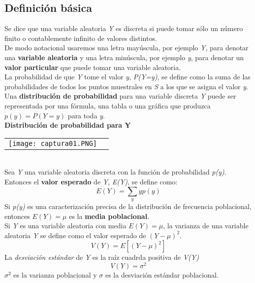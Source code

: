 \documentclass[10pt]{article}\usepackage[]{graphicx}\usepackage[]{color}
\begin{document}
\subsection{Definición básica}
Se dice que una variable aleatoria \textit{Y} es discreta si puede tomar sólo un número finito o contablemente infinito de valores distintos.\\
De modo notacional usaremos una letra mayúscula, por ejemplo \textit{Y}, para denotar una \textbf{variable aleatoria} y una letra minúscula, por ejemplo \textit{y}, para denotar un \textbf{valor particular} que puede tomar una variable aleatoria.\\
La probabilidad de que \textit{Y} tome el valor \textit{y}, \textit{P(Y=y)}, se define como la suma de las probabilidades de todos los puntos muestrales en \textit{S} a los que se asigna el valor \textit{y}.\\
Una \textbf{distribución de probabilidad} para una variable discreta \textit{Y} puede ser representada por una fórmula, una tabla o una gráfica que produzca $p(y)=P(Y=y)$ para toda \textit{y}.\\
\textbf{Distribución de probabilidad para Y}\\
\begin{tabular}{p{} p{} }
\texttt{[image: captura01.PNG]}
\end{tabular}\\
Sea \textit{Y} una variable aleatoria discreta con la función de probabilidad \textit{p(y)}. Entonces el \textbf{valor esperado} de \textit{Y}, \textit{E(Y)}, se define como:
\begin{equation*}
E(Y)=\sum_y yp(y)
\end{equation*}
Si \textit{p(y)} es una caracterización precisa de la distribución de frecuencia poblacional, entonces $E(Y)=\mu$ es la \textbf{media poblacional}.\\
Si \textit{Y} es una variable aleatoria con media $E(Y)=\mu$, la varianza de una variable aleatoria \textit{Y} se define como el valor esperado de $(Y-\mu)^2$.
\begin{equation*}
V(Y)=E[(Y-\mu)^2]
\end{equation*}
La \textit{desviación estándar} de \textit{Y} es la raíz cuadrda positiva de \textit{V(Y)}
\begin{equation*}
V(Y)=\sigma^2
\end{equation*}
$\sigma^2$ es la varianza poblacional y $\sigma$ es la desviación estándar poblacional.
\end{document}
